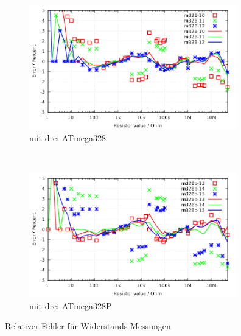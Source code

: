 \begin{figure}[H]
  \begin{subfigure}[b]{9cm}
    \centering
    \includegraphics[width=9cm]{../GNU/m328res_all.pdf}
    \caption{mit drei ATmega328}
    \label{fig:m328res_all}
  \end{subfigure}
  ~
  \begin{subfigure}[b]{9cm}
    \centering
    \includegraphics[width=9cm]{../GNU/m328pres_all.pdf}
    \caption{mit drei ATmega328P}
    \label{fig:m328pres_all}
  \end{subfigure}
\caption{Relativer Fehler für Widerstands-Messungen}
\end{figure}

